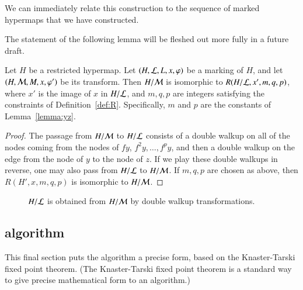 We can immediately relate this construction to the sequence of marked hypermaps that
we have constructed.

\begin{note} %
The statement of the following lemma will be fleshed out more fully in a future draft.
\end{note}

\begin{lemma} Let $H$ be a restricted hypermap.  Let $(H,{\cal L},L,x,\varphi)$ be
a marking of $H$, and let $(H,{\cal M},M,x,\varphi')$ be its transform.
Then $H/{\cal M}$ is isomorphic to $R(H/{\cal L},x',m,q,p)$, where $x'$ is the image
of $x$ in $H/{\cal L}$, and $m,q,p$ are integers satisfying the constraints of Definition~\ref{def:R}.
Specifically, $m$ and $p$ are the constants of Lemma~\ref{lemma:yz}.  
\end{lemma}

\begin{proof}
The passage from $H/{\cal M}$ to $H/{\cal L}$ consists of a double
walkup on all of the nodes coming from the nodes of $f y$, $f^2 y,
\ldots, f^p y$, and then a double walkup on the edge from the node of
$y$ to the node of
$z$.  %
If we play these double walkups in reverse,
one may also pass from $H/{\cal L}$ to $H/{\cal M}$.  
If
$m,q,p$ are chosen as above, then $R(H',x,m,q,p)$ is isomorphic to
$H/{\cal M}$.  
\end{proof}


\begin{figure}[htb]
\centering
{}
\caption{$H/{\cal L}$ is obtained from $H/{\cal M}$ by double walkup
transformations.}
\label{fig:L1L2dart}
\end{figure}



\subsection{algorithm}

This final section puts the algorithm a precise form, based on
the Knaster-Tarski fixed point theorem.  (The Knaster-Tarski fixed
point theorem is a standard way to give precise mathematical form to
an algorithm.)

